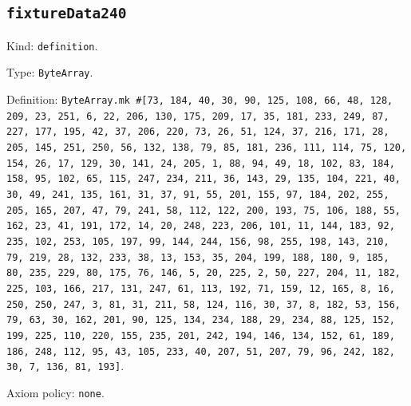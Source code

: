 \documentclass[11pt]{article}
\begin{document}
\subsection*{\texttt{fixtureData240}}
\noindent Kind: \texttt{definition}.\par
\noindent Type: \texttt{ByteArray}.\par
\noindent Definition: \texttt{ByteArray.mk \#[73, 184, 40, 30, 90, 125, 108, 66, 48, 128, 209, 23, 251, 6, 22, 206, 130, 175, 209, 17, 35, 181, 233, 249, 87, 227, 177, 195, 42, 37, 206, 220, 73, 26, 51, 124, 37, 216, 171, 28, 205, 145, 251, 250, 56, 132, 138, 79, 85, 181, 236, 111, 114, 75, 120, 154, 26, 17, 129, 30, 141, 24, 205, 1, 88, 94, 49, 18, 102, 83, 184, 158, 95, 102, 65, 115, 247, 234, 211, 36, 143, 29, 135, 104, 221, 40, 30, 49, 241, 135, 161, 31, 37, 91, 55, 201, 155, 97, 184, 202, 255, 205, 165, 207, 47, 79, 241, 58, 112, 122, 200, 193, 75, 106, 188, 55, 162, 23, 41, 191, 172, 14, 20, 248, 223, 206, 101, 11, 144, 183, 92, 235, 102, 253, 105, 197, 99, 144, 244, 156, 98, 255, 198, 143, 210, 79, 219, 28, 132, 233, 38, 13, 153, 35, 204, 199, 188, 180, 9, 185, 80, 235, 229, 80, 175, 76, 146, 5, 20, 225, 2, 50, 227, 204, 11, 182, 225, 103, 166, 217, 131, 247, 61, 113, 192, 71, 159, 12, 165, 8, 16, 250, 250, 247, 3, 81, 31, 211, 58, 124, 116, 30, 37, 8, 182, 53, 156, 79, 63, 30, 162, 201, 90, 125, 134, 234, 188, 29, 234, 88, 125, 152, 199, 225, 110, 220, 155, 235, 201, 242, 194, 146, 134, 152, 61, 189, 186, 248, 112, 95, 43, 105, 233, 40, 207, 51, 207, 79, 96, 242, 182, 30, 7, 136, 81, 193]}.\par
\noindent Axiom policy: \texttt{none}.\par
\end{document}
